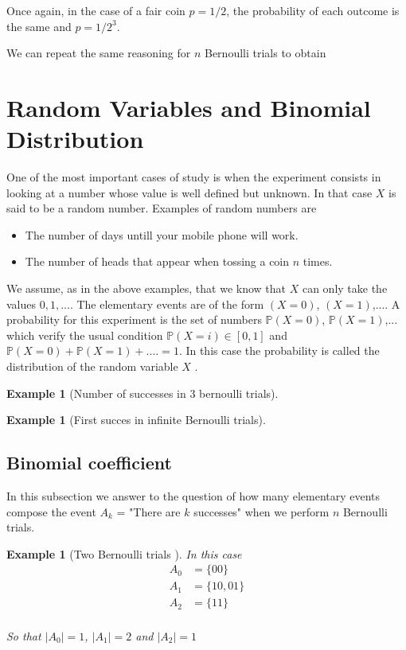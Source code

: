\documentclass[12pt]{article}
\newtheorem{example}[theorem]{Example}
\newcommand{\<}{{\langle \!\! \langle}}
\renewcommand{\>}{{\rangle \!\! \rangle}}
\newcommand{\bel}[2]{\begin{equation} \label{#1} \begin{split} #2
 					\end{split} \end{equation}}
\begin{document}
 Once again, in the case of a fair coin $p=1/2$, the probability of each outcome is the same and $p = 1/2^3$. 


We can repeat the same reasoning for $n$ Bernoulli trials to obtain 


\section{Random Variables and Binomial Distribution}
One of the most important cases of study is when the experiment consists in looking at a number whose value is well defined but unknown. In that case $X$ is said to be a random number. Examples of random numbers are 
\begin{itemize}

	\item The number of days untill your mobile phone will work.\\
	\item The number of heads that appear when tossing a coin $n$ times.

\end{itemize}
We assume, as in the above examples, that we know that $X$ can only take the values $0,1,...$. The elementary events are of the form $(X= 0 )$, $(X =1)$,.... A probability for this experiment is the set of numbers 
$\mathbb{P}(X = 0)$, $\mathbb{P}(X=1)$,... which verify the usual condition $\mathbb{P}(X = i)\in [0,1]$ and $\mathbb{P}(X = 0) +\mathbb{P}(X =1)+.... = 1$. In this case the probability is called the distribution of the random variable $X$ .

\begin{example}[Number of successes in 3 bernoulli trials]

\end{example}


\begin{example}[First succes in infinite Bernoulli trials]

\end{example}



\subsection{Binomial coefficient}

In this subsection we answer to the question of how many elementary events compose the event $A_k$ = "There are $k$ successes" when we perform $n$ Bernoulli trials.
\begin{example}[Two Bernoulli trials ]
	In this case \bel{}{A_0 & = \{00\}\\
				A_1 & =\{10,01\}\\
				A_2 & =\{11\}\\
				}

			So that $|A_0|=1$, $|A_1 |=2$ and $|A_2 |= 1$ 
\end{example}
\end{document}
